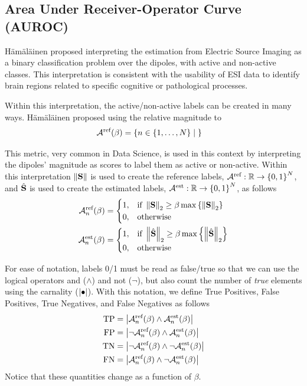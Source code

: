 \subsection{Area Under Receiver-Operator Curve (AUROC)}

H\"{a}m\"{a}l\"{a}inen proposed interpreting the estimation from Electric Source Imaging as a binary classification problem over the dipoles, with active and non-active classes.
%
This interpretation is consistent with the usability of ESI data to identify brain regions related to specific cognitive or pathological processes.

Within this interpretation, the active/non-active labels can be created in many ways. 
%
H\"{a}m\"{a}l\"{a}inen proposed using the relative magnitude to 
\begin{align}
\mathcal{A}^{\text{ref}}(\beta)
&=
\left\{ n\in\left\{ 1, \dots, N \right\} \;\middle|\;   \right\}
\end{align}

This metric, very common in Data Science, is used in this context by interpreting the dipoles' magnitude as scores to label them as active or non-active.
%
Within this interpretation $\left\lVert \mathbf{S} \right\rVert$ is used to create the reference labels, $\mathcal{A}^{\text{ref}}: \mathbb{R} \rightarrow \left\{ 0,1 \right\}^N$, and $\hat{\mathbf{S}}$ is used to create the estimated labels, $\mathcal{A}^{\text{est}}: \mathbb{R} \rightarrow \left\{ 0,1 \right\}^N$, as follows
\begin{align}
\mathcal{A}_n^{\text{ref}}(\beta)
&=
\begin{cases}
1, &\text{if }
\left\lVert \mathbf{S} \right\rVert_2 \geq \beta \max\left\{ \left\lVert \mathbf{S} \right\rVert_2 \right\}
\\
0, &\text{otherwise}
\end{cases}
\\
\mathcal{A}_n^{\text{est}}(\beta)
&=
\begin{cases}
1, &\text{if }
\left\lVert \hat{\mathbf{S}} \right\rVert_2 \geq \beta \max\left\{ \left\lVert \hat{\mathbf{S}} \right\rVert_2 \right\}
\\
0, &\text{otherwise}
\end{cases}
\end{align}

For ease of notation, labels 0/1 must be read as false/true so that we can use the logical operators and ($\wedge$) and not ($\neg$), but also count the number of \textit{true} elements using the carnality ($\left| {\bullet} \right|$).
%
With this notation, we define True Positives, False Positives, True Negatives, and False Negatives as follows
\begin{align}
\text{TP}
&=
\left| { 
\mathcal{A}_n^{\text{ref}}(\beta) \wedge 
\mathcal{A}_n^{\text{est}}(\beta) } \right|
\\
\text{FP}
&=
\left| { 
\neg \mathcal{A}_n^{\text{ref}}(\beta) \wedge 
\mathcal{A}_n^{\text{est}}(\beta) } \right|
\\
\text{TN}
&=
\left| { 
\neg \mathcal{A}_n^{\text{ref}}(\beta) \wedge 
\neg \mathcal{A}_n^{\text{est}}(\beta) } \right|
\\
\text{FN}
&=
\left| { 
\mathcal{A}_n^{\text{ref}}(\beta) \wedge 
\neg \mathcal{A}_n^{\text{est}}(\beta) } \right|
\end{align}
Notice that these quantities change as a function of $\beta$.

